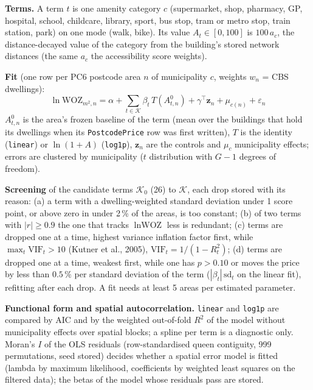 \documentclass[11pt]{article}
\newcommand{\code}[1]{\texttt{#1}}
\begin{document}
\textbf{Terms.} A term $t$ is one amenity category $c$ (supermarket, shop, pharmacy, GP, hospital, school, childcare, library, sport, bus stop, tram or metro stop, train station, park) on one mode (walk, bike). Its value $A_{t}\in[0,100]$ is $100\,a_c$, the distance-decayed value of the category from the building's stored network distances (the same $a_c$ the accessibility score weights).

\textbf{Fit} (one row per PC6 postcode area $n$ of municipality $c$, weights $w_n$ = CBS dwellings):
\begin{equation}
  \ln \text{WOZ}_{m^2,n} = \alpha + \sum_{t \in \mathcal{K}} \beta_{t}\,T(A^{0}_{t,n}) + \gamma^{\top}\mathbf{z}_n + \mu_{c(n)} + \varepsilon_n
\end{equation}
$A^{0}_{t,n}$ is the area's frozen baseline of the term (mean over the buildings that hold its dwellings when its \code{PostcodePrice} row was first written), $T$ is the identity (\code{linear}) or $\ln(1 + A)$ (\code{log1p}), $\mathbf{z}_n$ are the controls and $\mu_c$ municipality effects; errors are clustered by municipality ($t$ distribution with $G-1$ degrees of freedom).

\textbf{Screening} of the candidate terms $\mathcal{K}_0$ (26) to $\mathcal{K}$, each drop stored with its reason: (a) a term with a dwelling-weighted standard deviation under 1 score point, or above zero in under 2\,\% of the areas, is too constant; (b) of two terms with $|r| \ge 0.9$ the one that tracks $\ln\text{WOZ}$ less is redundant; (c) terms are dropped one at a time, highest variance inflation factor first, while $\max_t \text{VIF}_t > 10$ (Kutner et al., 2005), $\text{VIF}_t = 1/(1-R_t^2)$; (d) terms are dropped one at a time, weakest first, while one has $p > 0.10$ or moves the price by less than $0.5\,\%$ per standard deviation of the term ($|\beta_t|\,\mathrm{sd}_t$ on the linear fit), refitting after each drop. A fit needs at least 5 areas per estimated parameter.

\textbf{Functional form and spatial autocorrelation.} \code{linear} and \code{log1p} are compared by AIC and by the weighted out-of-fold $R^2$ of the model without municipality effects over spatial blocks; a spline per term is a diagnostic only. Moran's $I$ of the OLS residuals (row-standardised queen contiguity, 999 permutations, seed stored) decides whether a spatial error model is fitted (lambda by maximum likelihood, coefficients by weighted least squares on the filtered data); the betas of the model whose residuals pass are stored.
\end{document}
